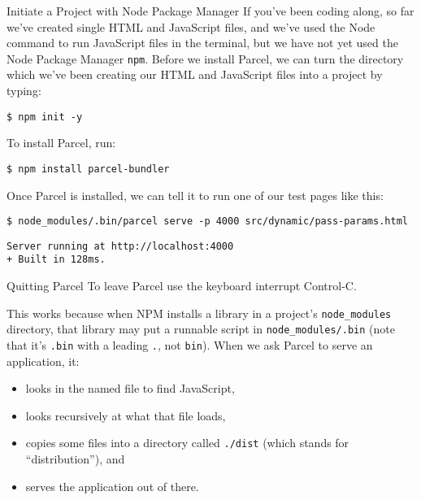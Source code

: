 \begin{aside}{Initiate a Project with Node Package Manager}
  If you've been coding along,
  so far we've created single HTML and JavaScript files,
  and we've used the Node command to run JavaScript files in the terminal, 
  but we have not yet used the Node Package Manager \texttt{npm}. 
  Before we install Parcel, 
  we can turn the directory 
  which we've been creating our HTML and JavaScript files into a project 
  by typing:

\begin{verbatim}
$ npm init -y
\end{verbatim}
\end{aside}

To install Parcel, run:

\begin{verbatim}
$ npm install parcel-bundler
\end{verbatim}

\noindent
Once Parcel is installed,
we can tell it to run one of our test pages like this:

\begin{verbatim}
$ node_modules/.bin/parcel serve -p 4000 src/dynamic/pass-params.html
\end{verbatim}

\begin{verbatim}
Server running at http://localhost:4000
+ Built in 128ms.
\end{verbatim}

\begin{aside}{Quitting Parcel}
  To leave Parcel use the keyboard interrupt Control-C.
\end{aside}

This works because when NPM installs a library in a project's \texttt{node\_modules} directory,
that library may put a runnable script in \texttt{node\_modules/.bin}
(note that it's \texttt{.bin} with a leading \texttt{.}, not \texttt{bin}).
When we ask Parcel to serve an application, it:

\begin{itemize}
\item
  looks in the named file to find JavaScript,
\item
  looks recursively at what that file loads,
\item
  copies some files into a directory called \texttt{./dist} (which stands for ``distribution''), and
\item
  serves the application out of there.
\end{itemize}

